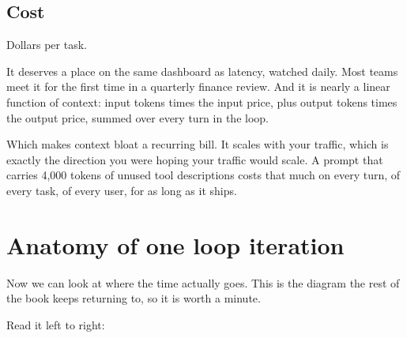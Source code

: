 
\subsection{Cost}

Dollars per task.

It deserves a place on the same dashboard as latency, watched daily. Most
teams meet it for the first time in a quarterly finance review. And it is
nearly a linear function of context: input tokens times the input price, plus output tokens times the output price, summed
over every turn in the loop.

Which makes context bloat a recurring bill. It scales with your traffic,
which is exactly the direction you were hoping your traffic would scale.
A prompt that carries 4,000 tokens of unused tool descriptions costs that
much on every turn, of every task, of every user, for as long as it ships.


\section{Anatomy of one loop iteration}
\label{sec:anatomy}

Now we can look at where the time actually goes. This is the diagram the rest of
the book keeps returning to, so it is worth a minute.


Read it left to right:

